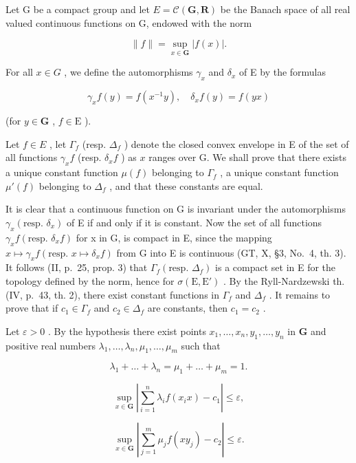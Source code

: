 Let G be a compact group and let \(E = \mathcal{C}(\mathbf{G}, \mathbf{R})\) be the Banach space of all real valued continuous functions on G, endowed with the norm

\[
\| f \| = \sup _ {x \in \mathbf {G}} | f (x) |.\tag{4}
\]

For all \(x \in G\) , we define the automorphisms \(\gamma_{x}\) and \(\delta_{x}\) of E by the formulas

\[
\gamma_ {x} f (y) = f \left(x ^ {- 1} y\right), \quad \delta_ {x} f (y) = f (y x)\tag{5}
\]

(for \(y \in \mathbf{G}\) , \(f \in \mathrm{E}\) ).

Let \(f \in E\) , let \(\Gamma_f\) (resp. \(\Delta_f\) ) denote the closed convex envelope in E of the set of all functions \(\gamma_x f\) (resp. \(\delta_x f\) ) as \(x\) ranges over G. We shall prove that there exists a unique constant function \(\mu(f)\) belonging to \(\Gamma_f\) , a unique constant function \(\mu'(f)\) belonging to \(\Delta_f\) , and that these constants are equal.

It is clear that a continuous function on G is invariant under the automorphisms \(\gamma_{x}(\text{resp. } \delta_{x})\) of E if and only if it is constant. Now the set of all functions \(\gamma_{x}f(\text{resp. } \delta_{x}f)\) for x in G, is compact in E, since the mapping \(x \mapsto \gamma_{x}f(\text{resp. } x \mapsto \delta_{x}f)\) from G into E is continuous (GT, X, §3, No.~4, th. 3). It follows (II, p.~25, prop. 3) that \(\Gamma_{f}(\text{resp. } \Delta_{f})\) is a compact set in E for the topology defined by the norm, hence for \(\sigma(\text{E}, \text{E}')\) . By the Ryll-Nardzewski th. (IV, p.~43, th. 2), there exist constant functions in \(\Gamma_{f}\) and \(\Delta_{f}\) . It remains to prove that if \(c_{1} \in \Gamma_{f}\) and \(c_{2} \in \Delta_{f}\) are constants, then \(c_{1} = c_{2}\) .

Let \(\varepsilon > 0\) . By the hypothesis there exist points \(x_{1}, \ldots, x_{n}, y_{1}, \ldots, y_{n}\) in \(\mathbf{G}\) and positive real numbers \(\lambda_{1}, \ldots, \lambda_{n}, \mu_{1}, \ldots, \mu_{m}\) such that

\[
\lambda_ {1} + \dots + \lambda_ {n} = \mu_ {1} + \dots + \mu_ {m} = 1.\tag{6}
\]

\[
\sup _ {x \in \mathbf {G}} \left| \sum_ {i = 1} ^ {n} \lambda_ {i} f (x _ {i} x) - c _ {1} \right| \leqslant \varepsilon ,\tag{7}
\]

\[
\sup _ {x \in \mathbf {G}} \left| \sum_ {j = 1} ^ {m} \mu_ {j} f (x y _ {j}) - c _ {2} \right| \leqslant \varepsilon .\tag{8}
\]


